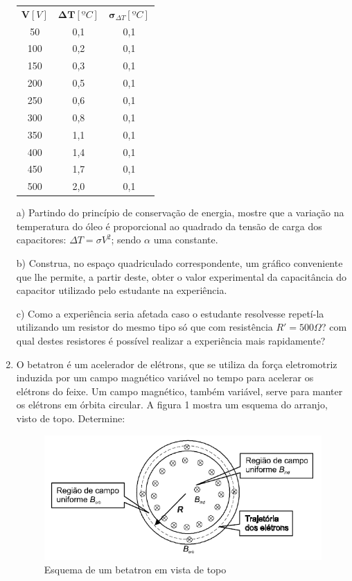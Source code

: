 \begin{enumerate}[start=1,label={\bfseries Q\arabic*.}]
\begin{center}
\begin{tabular}{|c|c|c|}
\hline
$\mathbf{V}[V]$ & $ \boldsymbol{\Delta T}[ºC] $ & $\boldsymbol{\sigma}_{\Delta T}[ºC]$ \\
50 & 0,1 & 0,1 \\ \hline
100 & 0,2 & 0,1 \\ \hline
150 & 0,3 & 0,1 \\ \hline
200 & 0,5 & 0,1 \\ \hline
250 & 0,6 & 0,1 \\ \hline
300 & 0,8 & 0,1 \\ \hline
350 & 1,1 & 0,1 \\ \hline
400 & 1,4 & 0,1 \\ \hline
450 & 1,7 & 0,1 \\ \hline
500 & 2,0 & 0,1 \\ \hline
\end{tabular}
\end{center}

a) Partindo do princípio de conservação de energia, mostre que a variação na temperatura do óleo é proporcional ao quadrado da tensão de carga dos capacitores: $\Delta T = \sigma V^{2}$; sendo $\alpha$ uma constante.

\resposta

b) Construa, no espaço quadriculado correspondente, um gráfico conveniente que lhe permite, a partir deste, obter o valor experimental da capacitância do capacitor utilizado pelo estudante na experiência.

\resposta

c) Como a experiência seria afetada caso o estudante resolvesse repetí-la utilizando um resistor do mesmo tipo só que com resistência $R' = 500 \Omega$? com qual destes resistores é possível realizar a experiência mais rapidamente?

\resposta


\item O betatron é um acelerador de elétrons, que se utiliza da força eletromotriz induzida por um campo magnético variável no tempo para acelerar os elétrons do feixe. Um campo magnético, também variável, serve para manter os elétrons em órbita circular. A figura 1 mostra um esquema do arranjo, visto de topo. Determine:
\begin{figure}[H]
\centering
\includegraphics[scale=0.8]{eletromag-img/eletromotriz.png}
\caption{Esquema de um betatron em vista de topo}
\end{figure}


\end{enumerate}
